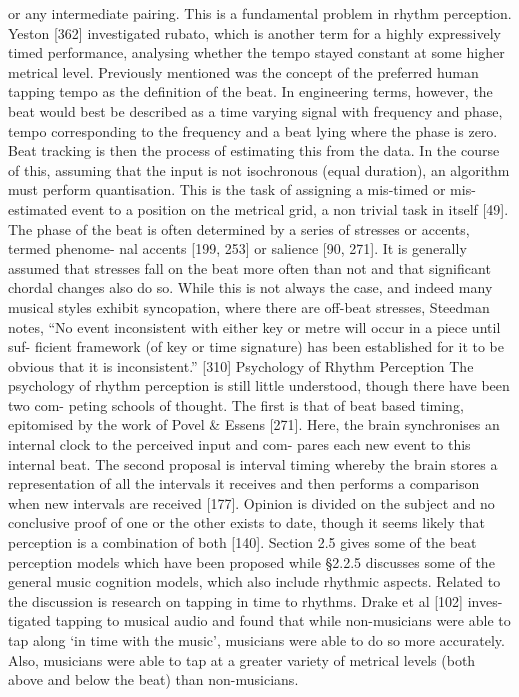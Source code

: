 or any intermediate pairing. This is a fundamental problem in rhythm perception. Yeston [362]
investigated rubato, which is another term for a highly expressively timed performance, analysing
whether the tempo stayed constant at some higher metrical level.
Previously mentioned was the concept of the preferred human tapping tempo as the definition
of the beat. In engineering terms, however, the beat would best be described as a time varying
signal with frequency and phase, tempo corresponding to the frequency and a beat lying where
the phase is zero. Beat tracking is then the process of estimating this from the data. In the course
of this, assuming that the input is not isochronous (equal duration), an algorithm must perform
quantisation. This is the task of assigning a mis-timed or mis-estimated event to a position on the
metrical grid, a non trivial task in itself [49].
The phase of the beat is often determined by a series of stresses or accents, termed phenome-
nal accents [199, 253] or salience [90, 271]. It is generally assumed that stresses fall on the beat
more often than not and that significant chordal changes also do so. While this is not always
the case, and indeed many musical styles exhibit syncopation, where there are off-beat stresses,
Steedman notes, “No event inconsistent with either key or metre will occur in a piece until suf-
ficient framework (of key or time signature) has been established for it to be obvious that it is
inconsistent.” [310]
Psychology of Rhythm Perception
The psychology of rhythm perception is still little understood, though there have been two com-
peting schools of thought. The first is that of beat based timing, epitomised by the work of Povel
& Essens [271]. Here, the brain synchronises an internal clock to the perceived input and com-
pares each new event to this internal beat. The second proposal is interval timing whereby the
brain stores a representation of all the intervals it receives and then performs a comparison when
new intervals are received [177]. Opinion is divided on the subject and no conclusive proof of one
or the other exists to date, though it seems likely that perception is a combination of both [140].
Section 2.5 gives some of the beat perception models which have been proposed while §2.2.5
discusses some of the general music cognition models, which also include rhythmic aspects.
Related to the discussion is research on tapping in time to rhythms. Drake et al [102] inves-
tigated tapping to musical audio and found that while non-musicians were able to tap along ‘in
time with the music’, musicians were able to do so more accurately. Also, musicians were able to
tap at a greater variety of metrical levels (both above and below the beat) than non-musicians.

